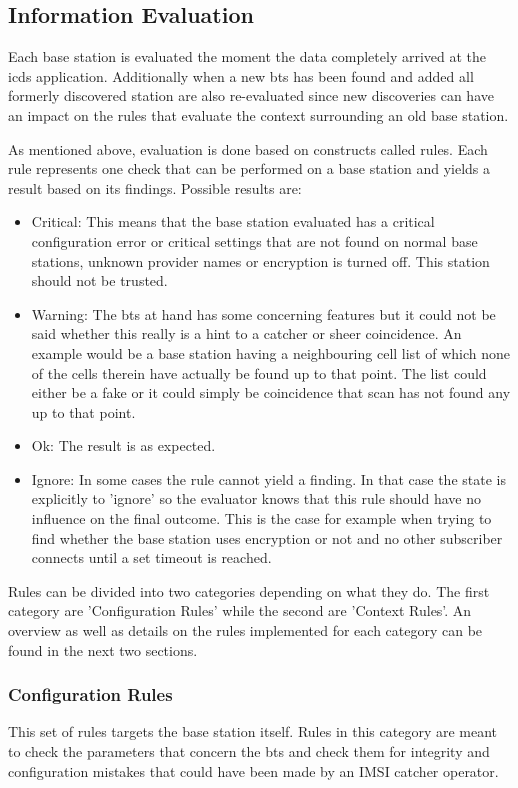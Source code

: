 \subsection{Information Evaluation}
\label{sec:info_evaluation}
Each base station is evaluated the moment the data completely arrived at the \gls{icds} application.
Additionally when a new \gls{bts} has been found and added all formerly discovered station are also re-evaluated since new discoveries can have an impact on the rules that evaluate the context surrounding an old base station.

As mentioned above, evaluation is done based on constructs called rules.
Each rule represents one check that can be performed on a base station and yields a result based on its findings.
Possible results are:
\begin{itemize}
	\item Critical: This means that the base station evaluated has a critical configuration error or critical settings that are not found on normal base stations, \eg unknown provider names or encryption is turned off.
	This station should not be trusted.
	\item Warning: The \gls{bts} at hand has some concerning features but it could not be said whether this really is a hint to a catcher or sheer coincidence.
	An example would be a base station having a  neighbouring cell list of which none of the cells therein have actually be found up to that point.
	The list could either be a fake or it could simply be coincidence that scan has not found any up to that point.
	\item Ok: The result is as expected.
	\item Ignore: In some cases the rule cannot yield a finding.
	In that case the state is explicitly to 'ignore' so the evaluator knows that this rule should have no influence on the final outcome.
	This is the case for example when trying to find whether the base station uses encryption or not and no other subscriber connects until a set timeout is reached.
\end{itemize}
Rules can be divided into two categories depending on what they do.
The first category are 'Configuration Rules' while the second are 'Context Rules'.
An overview as well as details on the rules implemented for each category can be found in the next two sections.

\subsubsection{Configuration Rules}
This set of rules targets the base station itself.
Rules in this category are meant to check the parameters that concern the \gls{bts} and check them for integrity and configuration mistakes that could have been made by an IMSI catcher operator.


